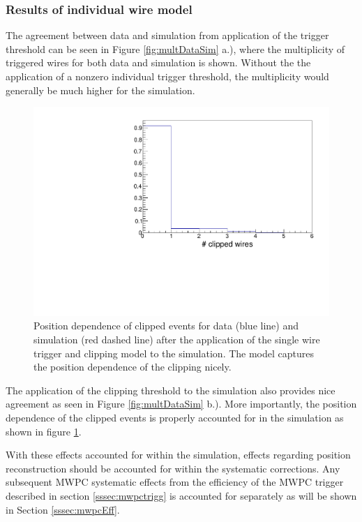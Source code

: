 \subsubsection{Results of individual wire model}

The agreement between data and simulation from application
of the trigger threshold can be seen in Figure \ref{fig:multDataSim} a.), where
the multiplicity of triggered wires for both data and simulation is shown. Without the
the application of a nonzero individual trigger threshold, the multiplicity would
generally be much higher for the simulation.


\begin{figure}[h]
  \centering
  \includegraphics[scale=0.6,page=6]{4-UCNACalibrations/mwpc_position.pdf} 
  \caption{Position dependence of clipped events for data (blue line) and simulation (red dashed line) after
    the application of the single wire trigger and clipping model to the simulation. The model captures the
    position dependence of the clipping nicely.}
  \label{fig:clippedPos}
\end{figure}

The application of the clipping threshold to the simulation also provides nice agreement
as seen in Figure \ref{fig:multDataSim} b.). More importantly, the position dependence
of the clipped events is properly accounted for in the simulation as shown in figure
\ref{fig:clippedPos}.

With these effects accounted for within the simulation, effects regarding position
reconstruction should be accounted for within the systematic corrections. Any subsequent
MWPC systematic effects from the efficiency of the MWPC trigger described in section
\ref{sssec:mwpctrigg} is accounted for separately as will be shown in Section \ref{sssec:mwpcEff}.


